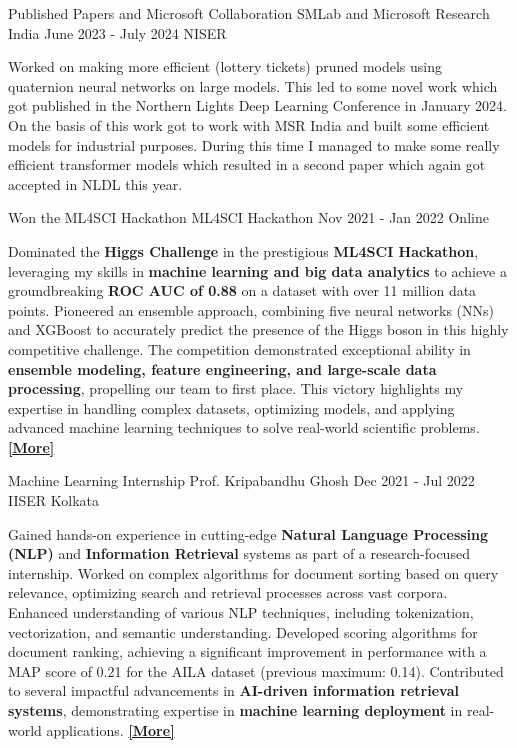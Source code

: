 

\cvevent
    {Published Papers and Microsoft Collaboration}  %
    {SMLab and Microsoft Research India}  %
    {June 2023 - July 2024}  %
    {NISER}  %
    \begin{justify}
        Worked on making more efficient (lottery tickets) pruned models using quaternion neural networks on large models. This led to some novel work which got published in the Northern Lights Deep Learning Conference in January 2024. On the basis of this work got to work with MSR India and built some efficient models for industrial purposes. During this time I managed to make some really efficient transformer models which resulted in a second paper which again got accepted in NLDL this year.
    \end{justify}
    \divider


\cvevent
    {Won the ML4SCI Hackathon}  %
    {ML4SCI Hackathon}  %
    {Nov 2021 - Jan 2022}  %
    {Online}  %
    \begin{justify}
        Dominated the \textbf{Higgs Challenge} in the prestigious \textbf{ML4SCI Hackathon}, leveraging my skills in \textbf{machine learning and big data analytics} to achieve a groundbreaking \textbf{ROC AUC of 0.88} on a dataset with over 11 million data points. Pioneered an ensemble approach, combining five neural networks (NNs) and XGBoost to accurately predict the presence of the Higgs boson in this highly competitive challenge. The competition demonstrated exceptional ability in \textbf{ensemble modeling, feature engineering, and large-scale data processing}, propelling our team to first place. This victory highlights my expertise in handling complex datasets, optimizing models, and applying advanced machine learning techniques to solve real-world scientific problems.  
        \href{https://github.com/PeithonKing/ML_comp}{\textbf{[More]}}
    \end{justify}
    \divider



\cvevent
    {Machine Learning Internship}  %
    {Prof. Kripabandhu Ghosh}  %
    {Dec 2021 - Jul 2022}  %
    {IISER Kolkata}  %
    \begin{justify}
        Gained hands-on experience in cutting-edge \textbf{Natural Language Processing (NLP)} and \textbf{Information Retrieval} systems as part of a research-focused internship. Worked on complex algorithms for document sorting based on query relevance, optimizing search and retrieval processes across vast corpora. Enhanced understanding of various NLP techniques, including tokenization, vectorization, and semantic understanding. Developed scoring algorithms for document ranking, achieving a significant improvement in performance with a MAP score of 0.21 for the AILA dataset (previous maximum: 0.14). Contributed to several impactful advancements in \textbf{AI-driven information retrieval systems}, demonstrating expertise in \textbf{machine learning deployment} in real-world applications.  
        \href{https://github.com/PeithonKing/AILA}{\textbf{[More]}}
    \end{justify}
    \divider


